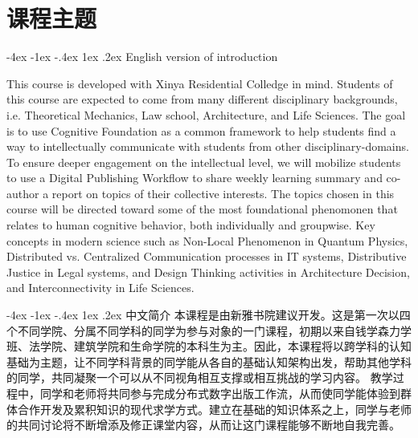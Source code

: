 \documentclass[11pt,fleqn]{book}
\makeatletter
\numberwithin{dummy}{section}
\theoremstyle{ocrenumbox}
\theoremstyle{blacknumex}
\theoremstyle{blacknumbox}
\theoremstyle{ocrenum}
\renewcommand{\section}{\@startsection{section}{1}{\z@}
	{-4ex \@plus -1ex \@minus -.4ex}
	{1ex \@plus.2ex }
	{\normalfont\large\sffamily\bfseries}}
\newif\ifusechapterimage
\newcommand{\thechapterimage}{}%
\newcommand{\chapterimage}[1]{\ifusechapterimage\renewcommand{\thechapterimage}{#1}\fi}%
\makeatother
\begin{document}

\chapterimage{chapter_head_2.pdf} %

\chapter{课程主题}

\section{English version of introduction}

This course is developed with Xinya Residential Colledge in mind. Students of this course are expected to come from many different disciplinary backgrounds, i.e. Theoretical Mechanics, Law school, Architecture, and Life Sciences. The goal is to use Cognitive Foundation as a common framework to help students find a way to intellectually communicate with students from other disciplinary-domains. To ensure deeper engagement on the intellectual level, we will mobilize students to use a Digital Publishing Workflow to share weekly learning summary and co-author a report on topics of their collective interests. The topics chosen in this course will be directed toward some of the most foundational phenomonen that relates to human cognitive behavior, both individually and groupwise. Key concepts in modern science such as Non-Local Phenomenon in Quantum Physics, Distributed vs. Centralized Communication processes in IT systems, Distributive Justice in Legal systems, and Design Thinking activities in Architecture Decision, and Interconnectivity in Life Sciences.

\section{中文简介}
本课程是由新雅书院建议开发。这是第一次以四个不同学院、分属不同学科的同学为参与对象的一门课程，初期以来自钱学森力学班、法学院、建筑学院和生命学院的本科生为主。因此，本课程将以跨学科的认知基础为主题，让不同学科背景的同学能从各自的基础认知架构出发，帮助其他学科的同学，共同凝聚一个可以从不同视角相互支撑或相互挑战的学习内容。 教学过程中，同学和老师将共同参与完成分布式数字出版工作流，从而使同学能体验到群体合作开发及累积知识的现代求学方式。建立在基础的知识体系之上，同学与老师的共同讨论将不断增添及修正课堂内容，从而让这门课程能够不断地自我完善。
\end{document}
